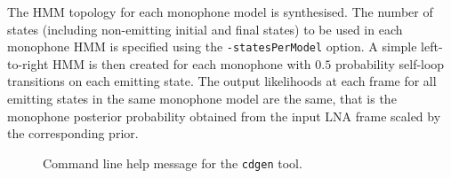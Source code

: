 \documentclass[a4paper,12pt]{report}
\begin{document}
The HMM topology for each monophone model is synthesised. The number of states (including non-emitting initial and final states) to be used in each monophone HMM is specified using the {\tt -statesPerModel} option. A simple left-to-right HMM is then created for each monophone with $0.5$ probability self-loop transitions on each emitting state. The output likelihoods at each frame for all emitting states in the same monophone model are the same, that is the monophone posterior probability obtained from the input LNA frame scaled by the corresponding prior. 




\begin{figure}
\begin{center}
\caption{Command line help message for the {\tt cdgen} tool.}
\label{fig:cdgen_help}
\end{center}
\end{figure}
\end{document}

